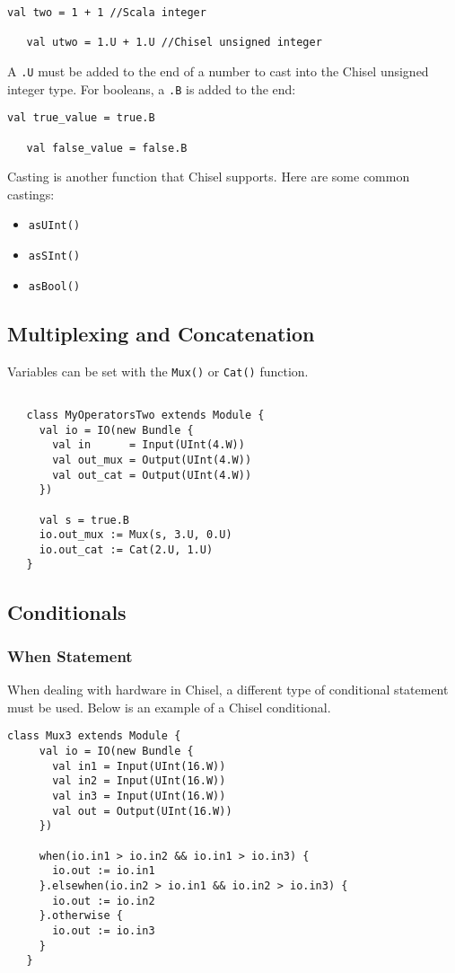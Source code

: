 \documentclass[12pt, letterpaper]{report}
\begin{document}
\begin{lstlisting}[style=scala]
   val two = 1 + 1 //Scala integer

   val utwo = 1.U + 1.U //Chisel unsigned integer

\end{lstlisting}

\noindent A \verb|.U| must be added to the end of a number to cast into the Chisel unsigned integer type. 
For booleans, a \verb|.B| is added to the end:

\begin{lstlisting}[style=scala]
   val true_value = true.B
   
   val false_value = false.B
\end{lstlisting}

\noindent Casting is another function that Chisel supports. 
Here are some common castings:

\begin{itemize}
   \item \verb|asUInt()|
   \item \verb|asSInt()|
   \item \verb|asBool()|
\end{itemize}
\pagebreak
\subsection{Multiplexing and Concatenation}
Variables can be set with the \verb|Mux()| or \verb|Cat()| function.
\begin{lstlisting}[style=scala]

   class MyOperatorsTwo extends Module {
     val io = IO(new Bundle {
       val in      = Input(UInt(4.W))
       val out_mux = Output(UInt(4.W))
       val out_cat = Output(UInt(4.W))
     })

     val s = true.B
     io.out_mux := Mux(s, 3.U, 0.U) 
     io.out_cat := Cat(2.U, 1.U)    
   }
\end{lstlisting}
\subsection{Conditionals}
\subsubsection{When Statement}
When dealing with hardware in Chisel, a different type of conditional statement must be used. 
Below is an example of a Chisel conditional.

\begin{lstlisting}[style=scala]
   class Mux3 extends Module {
     val io = IO(new Bundle {
       val in1 = Input(UInt(16.W))
       val in2 = Input(UInt(16.W))
       val in3 = Input(UInt(16.W))
       val out = Output(UInt(16.W))
     })
    
     when(io.in1 > io.in2 && io.in1 > io.in3) {
       io.out := io.in1  
     }.elsewhen(io.in2 > io.in1 && io.in2 > io.in3) {
       io.out := io.in2 
     }.otherwise {
       io.out := io.in3
     }
   }
\end{lstlisting}
\end{document}

